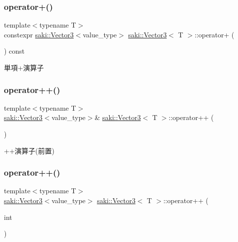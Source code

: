\subsubsection{\texorpdfstring{operator+()}{operator+()}}
{\footnotesize\ttfamily template$<$typename T$>$ \\
constexpr \mbox{\hyperlink{classsaki_1_1_vector3}{saki\+::\+Vector3}}$<$value\+\_\+type$>$ \mbox{\hyperlink{classsaki_1_1_vector3}{saki\+::\+Vector3}}$<$ T $>$\+::operator+ (\begin{DoxyParamCaption}{ }\end{DoxyParamCaption}) const\hspace{0.3cm}{\ttfamily [inline]}}



単項+演算子 

\mbox{\label{classsaki_1_1_vector3_a12d87bca02ff8707522914c7866a5e18}} 
\subsubsection{\texorpdfstring{operator++()}{operator++()}\hspace{0.1cm}{\footnotesize\ttfamily [1/2]}}
{\footnotesize\ttfamily template$<$typename T$>$ \\
\mbox{\hyperlink{classsaki_1_1_vector3}{saki\+::\+Vector3}}$<$value\+\_\+type$>$\& \mbox{\hyperlink{classsaki_1_1_vector3}{saki\+::\+Vector3}}$<$ T $>$\+::operator++ (\begin{DoxyParamCaption}{ }\end{DoxyParamCaption})\hspace{0.3cm}{\ttfamily [inline]}}



++演算子(前置) 

\mbox{\label{classsaki_1_1_vector3_a04791f1471c7b858ee54f5dbe05d6bc6}} 
\subsubsection{\texorpdfstring{operator++()}{operator++()}\hspace{0.1cm}{\footnotesize\ttfamily [2/2]}}
{\footnotesize\ttfamily template$<$typename T$>$ \\
\mbox{\hyperlink{classsaki_1_1_vector3}{saki\+::\+Vector3}}$<$value\+\_\+type$>$ \mbox{\hyperlink{classsaki_1_1_vector3}{saki\+::\+Vector3}}$<$ T $>$\+::operator++ (\begin{DoxyParamCaption}\item[{int}]{ }\end{DoxyParamCaption})\hspace{0.3cm}{\ttfamily [inline]}}



